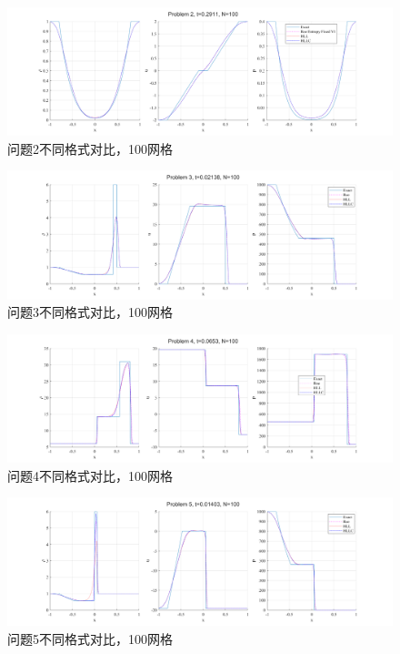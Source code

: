 \documentclass[UTF8,zihao=5]{ctexart} %
\begin{document}
\begin{figure}[H]
    \centering
    \includegraphics[width=18cm]{p2_SUM_N100.png}  %
    \caption{问题2不同格式对比，100网格}
\end{figure}

\begin{figure}[H]
    \centering
    \includegraphics[width=18cm]{p3_SUM_N100.png}  %
    \caption{问题3不同格式对比，100网格}
\end{figure}

\begin{figure}[H]
    \centering
    \includegraphics[width=18cm]{p4_SUM_N100.png}  %
    \caption{问题4不同格式对比，100网格}
\end{figure}

\begin{figure}[H]
    \centering
    \includegraphics[width=18cm]{p5_SUM_N100.png}  %
    \caption{问题5不同格式对比，100网格}
\end{figure}
\end{document}
